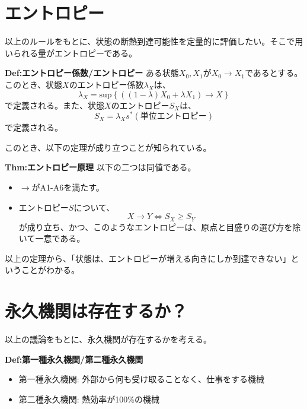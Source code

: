 \documentclass[a3paper, twocolumn, 11pt]{jsarticle}
\begin{document}
\section{エントロピー}
以上のルールをもとに、状態の断熱到達可能性を定量的に評価したい。そこで用いられる量がエントロピーである。\\
\begin{itembox}[l]{\textbf{Def:エントロピー係数/エントロピー}}
    ある状態$X_0,X_1$が$X_0 \rightarrow X_1$であるとする。このとき、状態$X$のエントロピー係数$\lambda_X$は、
    \begin{equation}
        \lambda_X = \text{sup} \left\{ ((1-\lambda)X_0 + \lambda X_1) \rightarrow X \right\}
    \end{equation}
    で定義される。また、状態$X$のエントロピー$S_X$は、
    \begin{equation}
        S_X = \lambda_X s^*(\text{単位エントロピー})
    \end{equation}
    で定義される。
\end{itembox}
このとき、以下の定理が成り立つことが知られている。
\begin{itembox}[l]{\textbf{Thm:エントロピー原理}}
    以下の二つは同値である。
    \begin{itemize}
        \item $\rightarrow$がA1-A6を満たす。
        \item エントロピー$S$について、
        \begin{equation}
            X \rightarrow Y \Leftrightarrow S_X \geq S_Y
        \end{equation}
        が成り立ち、かつ、このようなエントロピーは、原点と目盛りの選び方を除いて一意である。
    \end{itemize}
\end{itembox}
以上の定理から、「状態は、エントロピーが増える向きにしか到達できない」ということがわかる。\\

\section{永久機関は存在するか？}
以上の議論をもとに、永久機関が存在するかを考える。
\begin{itembox}[l]{\textbf{Def:第一種永久機関/第二種永久機関}}
    \begin{itemize}
        \item 第一種永久機関: 外部から何も受け取ることなく、仕事をする機械
        \item 第二種永久機関: 熱効率が100\%の機械
    \end{itemize}
\end{itembox}
\end{document}
